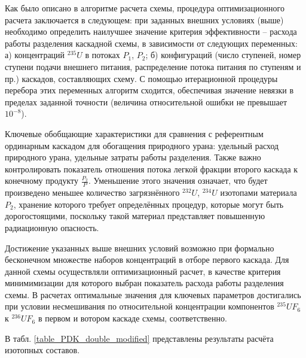Как было описано в алгоритме расчета схемы, процедура оптимизационного расчета заключается в следующем: при заданных внешних условиях (выше) необходимо определить наилучшее значение критерия эффективности -- расхода работы разделения каскадной схемы, в зависимости от следующих переменных: а) концентраций $^{235}U$ в потоках $P_1$, $P_2$; б) конфигураций (число ступеней, номер ступени подачи внешнего питания, распределение потока питания по ступеням и пр.) каскадов, составляющих схему. С помощью итерационной процедуры перебора этих переменных алгоритм сходится, обеспечивая значение невязки в пределах заданной точности (величина относительной ошибки не превышает $10^{-8}$).
 
Ключевые обобщающие характеристики для сравнения с референтным ординарным каскадом для обогащения природного урана: удельный расход природного урана, удельные затраты работы разделения. Также важно контролировать показатель отношения потока легкой фракции второго каскада к конечному продукту $\frac{P_2}{P}$. Уменьшение этого значения означает, что будет произведено меньшее количество загрязнённого $^{232}U$, $^{234}U$ изотопами материала $P_2$, хранение которого требует определённых процедур, которые могут быть дорогостоящими, поскольку такой материал представляет повышенную радиационную опасность.

Достижение указанных выше внешних условий возможно при формально бесконечном множестве наборов концентраций в отборе первого каскада. Для данной схемы осуществляли оптимизационный расчет, в качестве критерия минимимизации для которого выбран показатель расхода работы разделения схемы. В расчетах оптимальные значения для ключевых параметров достигались при условии несмешивания по относительной концентрации компонентов $^{235}UF_6$ к $^{236}UF_6$ в первом и вотором каскаде схемы, соответственно.

В табл. \ref{table_PDK_double_modified} представлены результаты расчёта изотопных составов.

